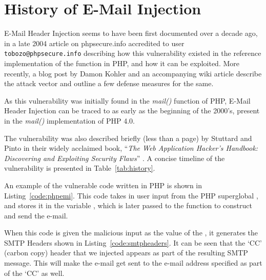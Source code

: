 \section{History of E-Mail Injection}

E-Mail Header Injection seems to have been first documented over a decade ago, in a late 2004 article on phpsecure.info \cite{Tobozo} accredited to user \lstinline|tobozo@phpsecure.info| describing how this vulnerability existed in the reference implementation of the  function in PHP, and how it can be exploited. More recently, a blog post by Damon Kohler \cite{DK} and an accompanying wiki article \cite{Injection} describe the attack vector and outline a few defense measures for the same.

As this vulnerability was initially found in the \emph{mail()} function of PHP, E-Mail Header Injection can be traced to as early as the beginning of the 2000's, present in the \emph{mail()} implementation of PHP 4.0. 

The vulnerability was also described briefly (less than a page) by Stuttard and Pinto in their widely acclaimed book, ``\emph{The Web Application Hacker's Handbook: Discovering and Exploiting Security Flaws}'' \cite{stuttard2011web}. 
A concise timeline of the vulnerability is presented in Table~\ref{tab:history}.

An example of the vulnerable code written in PHP is shown in Listing~\ref{code:phpemi}. This code takes in user input from the PHP superglobal , and stores it in the variable , which is later passed to the  function to construct and send the e-mail.

	
When this code is given the malicious input  as the value of the , it generates the SMTP Headers shown in Listing~\ref{code:smtpheaders}. It can be seen that the `CC' (carbon copy) header that we injected appears as part of the resulting SMTP message. This will make the e-mail get sent to the e-mail address specified as part of the `CC' as well.


